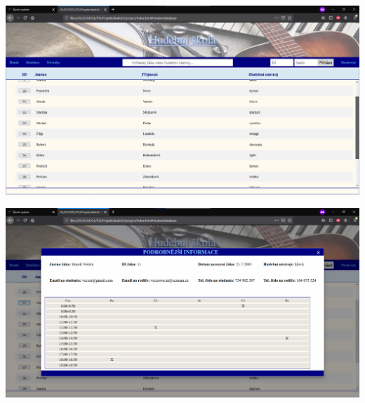 \documentclass[a4paper, 11pt, twocolumn]{article}
\begin{document}
	\vspace*{\fill}
	\clearpage


	\begin{center}
	\includegraphics[width=1\textwidth]{teachers_search_1.png}
	\end{center}
	\vspace*{\fill}
	\begin{center}
	\includegraphics[width=1\textwidth]{teachers_modal.png}
	\end{center}


	\vspace*{\fill}
	\clearpage	
\end{document}

